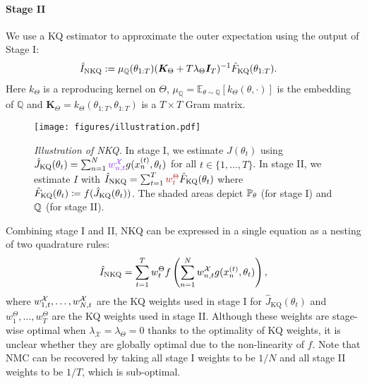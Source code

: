 \paragraph{Stage II}
We use a KQ estimator to approximate the outer expectation using the output of Stage I:
\begin{align}\label{eq:NKQ_estimator}
    \hat{I}_{\text{NKQ}} &:= \mu_{\mathbb{Q}}(\theta_{1:T}) ( \boldsymbol{K}_\Theta + T \lambda_\Theta \boldsymbol{I}_T)^{-1} \hat{F}_{\text{KQ}}( \theta_{1:T} ).
\end{align}
Here $k_\Theta$ is a reproducing kernel on $\Theta$,  $\mu_{\mathbb{Q}} = \mathbb{E}_{\theta \sim \mathbb{Q}}[k_{\Theta}(\theta, \cdot)]$ is the embedding of $\mathbb{Q}$ and $\boldsymbol{K}_\Theta = k_\Theta(\theta_{1:T}, \theta_{1:T})$ is a $T\times T$ Gram matrix. 

\begin{figure}[t]
    \centering
    \texttt{[image: figures/illustration.pdf]}
    \caption{\textit{Illustration of NKQ.} In stage I, we estimate $J(\theta_t)$ using $\hat{J}_{\kq}(\theta_t) = \sum_{n=1}^N \textcolor{blueviolet}{w_{n, t}^\mathcal{X}} g(x_n^{(t)}, \theta_t)$ for all $t \in \{ 1, \ldots, T\}$. 
    In stage II, we estimate $I$ with $\hat{I}_{\nkq} = \sum_{t=1}^T \textcolor{brown}{w^\Theta_t} \hat{F}_{\kq}(\theta_t)$ where $\hat{F}_{\text{KQ}}(\theta_t) \coloneq f(\hat{J}_{\text{KQ}}(\theta_t))$. 
    The shaded areas depict $\mathbb{P}_\theta$ (for stage I) and $\mathbb{Q}$ (for stage II).}
    \label{fig:illustration}
\end{figure}


Combining stage I and II, NKQ can be expressed in a single equation as a nesting of two quadrature rules:
\begin{align}\label{eq:nkq_weights}
    \hat{I}_{\text{NKQ}} = \sum_{t=1}^{T} w^{\Theta}_t f\left(\sum_{n=1}^N w^{\mathcal{X}}_{n, t} g(x_n^{(t)}, \theta_t) \right),
\end{align}
where $w^{\mathcal{X}}_{1, t},\ldots,w^{\mathcal{X}}_{N, t}$ are the KQ weights used in stage I for $\hat{J}_{\text{KQ}}(\theta_t)$ and $w^{\Theta}_1,\ldots, w^{\Theta}_T$ are the KQ weights used in stage II.
Although these weights are stage-wise optimal when $\lambda_{\mathcal{X}} = \lambda_\Theta = 0$ thanks to the optimality of KQ weights, it is unclear whether they are globally optimal due to the non-linearity of $f$. Note that NMC can be recovered by taking all stage I weights to be $1/N$ and all stage II weights to be $1/T$, which is sub-optimal. 


